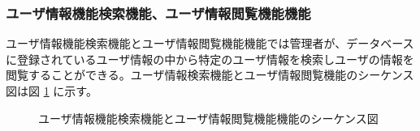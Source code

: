 \documentclass[a4j]{jarticle}
\begin{document}
  \subsubsection{ユーザ情報機能検索機能、ユーザ情報閲覧機能機能}
  ユーザ情報機能検索機能とユーザ情報閲覧機能機能では管理者が、データベースに登録されているユーザ情報の中から特定のユーザ情報を検索しユーザの情報を閲覧することができる。ユーザ情報検索機能とユーザ情報閲覧機能のシーケンス図は図 \ref{fig:admin_user_reading-search.png} に示す。
  \begin{figure}[H]
    \centering
    \caption{ユーザ情報機能検索機能とユーザ情報閲覧機能機能のシーケンス図}
    \label{fig:admin_user_reading-search.png}
  \end{figure}
\end{document}
